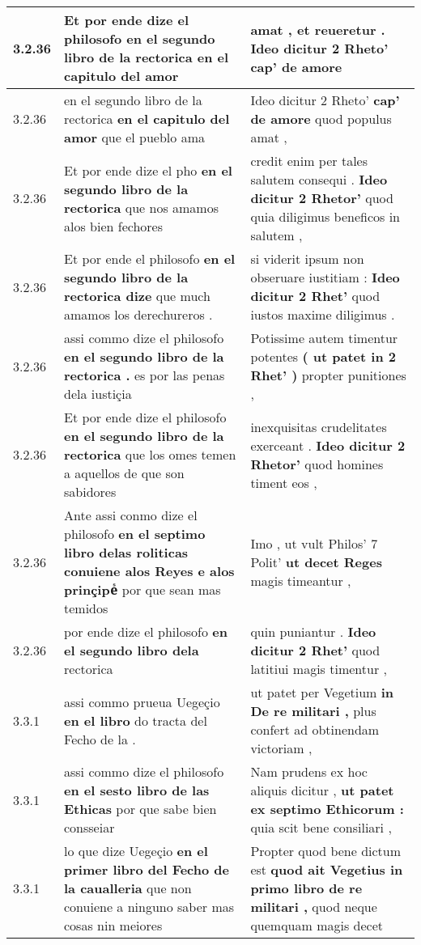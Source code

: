 \begin{tabular}{|p{1cm}|p{6.5cm}|p{6.5cm}|}
3.2.36 & Et por ende dize el philosofo \textbf{ en el segundo libro de la rectorica } en el capitulo del amor & amat , et reueretur . \textbf{ Ideo dicitur 2 Rheto’ } cap’ de amore \\\hline
3.2.36 & en el segundo libro de la rectorica \textbf{ en el capitulo del amor } que el pueblo ama & Ideo dicitur 2 Rheto’ \textbf{ cap’ de amore } quod populus amat , \\\hline
3.2.36 & Et por ende dize el pho \textbf{ en el segundo libro de la rectorica } que nos amamos alos bien fechores & credit enim per tales salutem consequi . \textbf{ Ideo dicitur 2 Rhetor’ } quod quia diligimus beneficos in salutem , \\\hline
3.2.36 & Et por ende el philosofo \textbf{ en el segundo libro de la rectorica dize } que much amamos los derechureros . & si viderit ipsum non obseruare iustitiam : \textbf{ Ideo dicitur 2 Rhet’ } quod iustos maxime diligimus . \\\hline
3.2.36 & assi commo dize el philosofo \textbf{ en el segundo libro de la rectorica . } es por las penas dela iustiçia & Potissime autem timentur potentes \textbf{ ( ut patet in 2 Rhet’ ) } propter punitiones , \\\hline
3.2.36 & Et por ende dize el philosofo \textbf{ en el segundo libro de la rectorica } que los omes temen a aquellos de que son sabidores & inexquisitas crudelitates exerceant . \textbf{ Ideo dicitur 2 Rhetor’ } quod homines timent eos , \\\hline
3.2.36 & Ante assi conmo dize el philosofo \textbf{ en el septimo libro delas roliticas conuiene alos Reyes e alos prinçipeᷤ } por que sean mas temidos & Imo , ut vult Philos’ 7 Polit’ \textbf{ ut decet Reges } magis timeantur , \\\hline
3.2.36 & por ende dize el philosofo \textbf{ en el segundo libro dela } rectorica & quin puniantur . \textbf{ Ideo dicitur 2 Rhet’ } quod latitiui magis timentur , \\\hline
3.3.1 & assi commo prueua Uegeçio \textbf{ en el libro } do tracta del Fecho de la . & ut patet per Vegetium \textbf{ in De re militari , } plus confert ad obtinendam victoriam , \\\hline
3.3.1 & assi commo dize el philosofo \textbf{ en el sesto libro de las Ethicas } por que sabe bien consseiar & Nam prudens ex hoc aliquis dicitur , \textbf{ ut patet ex septimo Ethicorum : } quia scit bene consiliari , \\\hline
3.3.1 & lo que dize Uegeçio \textbf{ en el primer libro del Fecho de la caualleria } que non conuiene a ninguno saber mas cosas nin meiores & Propter quod bene dictum est \textbf{ quod ait Vegetius in primo libro de re militari , } quod neque quemquam magis decet \\\hline

\end{tabular}
